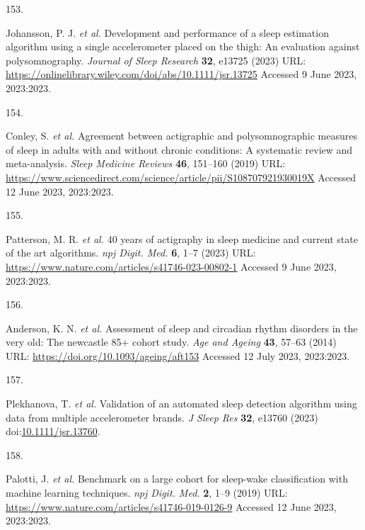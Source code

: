 \documentclass[
  9pt,
]{scrbook}
\newlength{\cslhangindent}
\newlength{\csllabelwidth}
\newlength{\cslentryspacingunit} %
\newenvironment{CSLReferences}[2] %
 {%
  \setlength{\parindent}{0pt}
  \ifodd #1
  \let\oldpar\par
  \def\par{\hangindent=\cslhangindent\oldpar}
  \fi
  \setlength{\parskip}{#2\cslentryspacingunit}
 }%
 {}
\newcommand{\CSLLeftMargin}[1]{\parbox[t]{\csllabelwidth}{#1}}
\newcommand{\CSLRightInline}[1]{\parbox[t]{\linewidth - \csllabelwidth}{#1}\break}
\begin{document}
\begin{CSLReferences}{0}{0}
\leavevmode{}%
\CSLLeftMargin{153. }%
\CSLRightInline{Johansson, P. J. \emph{et al.} Development and
performance of a sleep estimation algorithm using a single accelerometer
placed on the thigh: An evaluation against polysomnography.
\emph{Journal of Sleep Research} \textbf{32}, e13725 (2023) URL:
\url{https://onlinelibrary.wiley.com/doi/abs/10.1111/jsr.13725} Accessed
9 June 2023, 2023:2023.}

\leavevmode{}%
\CSLLeftMargin{154. }%
\CSLRightInline{Conley, S. \emph{et al.} Agreement between actigraphic
and polysomnographic measures of sleep in adults with and without
chronic conditions: A systematic review and meta-analysis. \emph{Sleep
Medicine Reviews} \textbf{46}, 151--160 (2019) URL:
\url{https://www.sciencedirect.com/science/article/pii/S108707921930019X}
Accessed 12 June 2023, 2023:2023.}

\leavevmode{}%
\CSLLeftMargin{155. }%
\CSLRightInline{Patterson, M. R. \emph{et al.} 40 years of actigraphy in
sleep medicine and current state of the art algorithms. \emph{npj Digit.
Med.} \textbf{6}, 1--7 (2023) URL:
\url{https://www.nature.com/articles/s41746-023-00802-1} Accessed 9 June
2023, 2023:2023.}

\leavevmode{}%
\CSLLeftMargin{156. }%
\CSLRightInline{Anderson, K. N. \emph{et al.} Assessment of sleep and
circadian rhythm disorders in the very old: The newcastle 85+ cohort
study. \emph{Age and Ageing} \textbf{43}, 57--63 (2014) URL:
\url{https://doi.org/10.1093/ageing/aft153} Accessed 12 July 2023,
2023:2023.}

\leavevmode{}%
\CSLLeftMargin{157. }%
\CSLRightInline{Plekhanova, T. \emph{et al.} Validation of an automated
sleep detection algorithm using data from multiple accelerometer brands.
\emph{J Sleep Res} \textbf{32}, e13760 (2023)
doi:\href{https://doi.org/10.1111/jsr.13760}{10.1111/jsr.13760}.}

\leavevmode{}%
\CSLLeftMargin{158. }%
\CSLRightInline{Palotti, J. \emph{et al.} Benchmark on a large cohort
for sleep-wake classification with machine learning techniques.
\emph{npj Digit. Med.} \textbf{2}, 1--9 (2019) URL:
\url{https://www.nature.com/articles/s41746-019-0126-9} Accessed 12 June
2023, 2023:2023.}

\end{CSLReferences}
\end{document}
